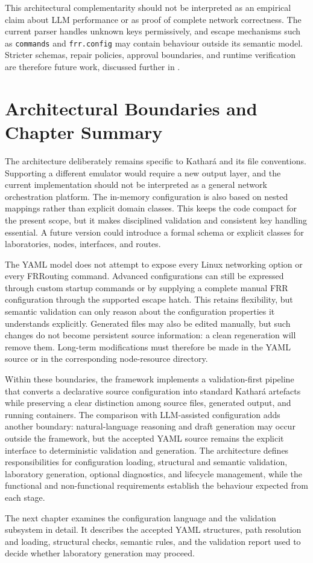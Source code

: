 This architectural complementarity should not be interpreted as an empirical
claim about LLM performance or as proof of complete network correctness. The
current parser handles unknown keys permissively, and escape mechanisms such as
\texttt{commands} and \texttt{frr.config} may contain behaviour outside its
semantic model. Stricter schemas, repair policies, approval boundaries, and
runtime verification are therefore future work, discussed further in
.

\section{Architectural Boundaries and Chapter Summary}
\label{sec:architectural-boundaries-summary}

The architecture deliberately remains specific to Kathar\'a and its file
conventions. Supporting a different emulator would require a new output layer,
and the current implementation should not be interpreted as a general network
orchestration platform. The in-memory configuration is also based on nested
mappings rather than explicit domain classes. This keeps the code compact for
the present scope, but it makes disciplined validation and consistent key
handling essential. A future version could introduce a formal schema or
explicit classes for laboratories, nodes, interfaces, and routes.

The YAML model does not attempt to expose every Linux networking option or
every FRRouting command. Advanced configurations can still be expressed
through custom startup commands or by supplying a complete manual FRR
configuration through the supported escape hatch. This retains flexibility,
but semantic validation can only reason about the configuration properties it
understands explicitly. Generated files may also be edited manually, but such
changes do not become persistent source information: a clean regeneration will
remove them. Long-term modifications must therefore be made in the YAML source
or in the corresponding node-resource directory.

Within these boundaries, the framework implements a validation-first pipeline
that converts a declarative source configuration into standard Kathar\'a
artefacts while preserving a clear distinction among source files, generated
output, and running containers. The comparison with LLM-assisted configuration
adds another boundary: natural-language reasoning and draft generation may
occur outside the framework, but the accepted YAML source remains the explicit
interface to deterministic validation and generation. The architecture defines
responsibilities for configuration loading, structural and semantic validation,
laboratory generation, optional diagnostics, and lifecycle management, while
the functional and non-functional requirements establish the behaviour expected
from each stage.

The next chapter examines the configuration language and the validation
subsystem in detail. It describes the accepted YAML structures, path
resolution and loading, structural checks, semantic rules, and the validation
report used to decide whether laboratory generation may proceed.
